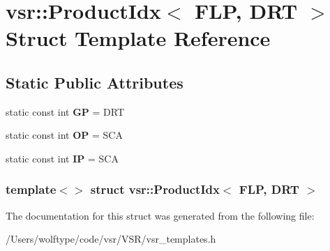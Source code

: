 \hypertarget{structvsr_1_1_product_idx_3_01_f_l_p_00_01_d_r_t_01_4}{\section{vsr\-:\-:Product\-Idx$<$ F\-L\-P, D\-R\-T $>$ Struct Template Reference}
\label{structvsr_1_1_product_idx_3_01_f_l_p_00_01_d_r_t_01_4}
}
\subsection*{Static Public Attributes}
\begin{DoxyCompactItemize}
\item 
\hypertarget{structvsr_1_1_product_idx_3_01_f_l_p_00_01_d_r_t_01_4_a6e96c25e2c24ea8493e53a3035e4402e}{static const int {\bfseries G\-P} = D\-R\-T}\label{structvsr_1_1_product_idx_3_01_f_l_p_00_01_d_r_t_01_4_a6e96c25e2c24ea8493e53a3035e4402e}

\item 
\hypertarget{structvsr_1_1_product_idx_3_01_f_l_p_00_01_d_r_t_01_4_a1e0fc70696b1736de942b4c96bce2d02}{static const int {\bfseries O\-P} = S\-C\-A}\label{structvsr_1_1_product_idx_3_01_f_l_p_00_01_d_r_t_01_4_a1e0fc70696b1736de942b4c96bce2d02}

\item 
\hypertarget{structvsr_1_1_product_idx_3_01_f_l_p_00_01_d_r_t_01_4_a1b1d709e9ee5d7e7597f9ab995fa6ee8}{static const int {\bfseries I\-P} = S\-C\-A}\label{structvsr_1_1_product_idx_3_01_f_l_p_00_01_d_r_t_01_4_a1b1d709e9ee5d7e7597f9ab995fa6ee8}

\end{DoxyCompactItemize}
\subsubsection*{template$<$$>$ struct vsr\-::\-Product\-Idx$<$ F\-L\-P, D\-R\-T $>$}



The documentation for this struct was generated from the following file\-:\begin{DoxyCompactItemize}
\item 
/\-Users/wolftype/code/vsr/\-V\-S\-R/vsr\-\_\-templates.\-h\end{DoxyCompactItemize}
